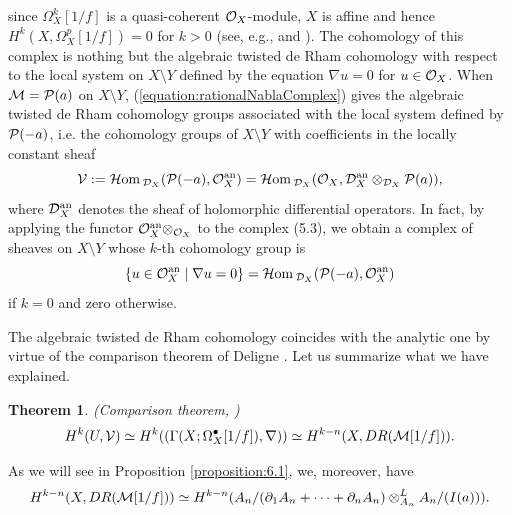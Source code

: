 \documentclass[12pt]{article}
\def\pd#1{ \partial_{#1} }
\def\Hom{ {\cal H}{\rm om}\, }
\def\Dsc{ {\cal D} }
\def\Msc{ {\cal M} }
\def\Osc{ {\cal O} }
\def\Psc{ {\cal P} }
\def\Vsc{ {\cal V} }
\newtheorem{theorem}{Theorem}[section]
\begin{document}
since $\Omega_X^{k}[1/f]$ is a quasi-coherent $\Osc_X$-module,
$X$ is affine and hence
$ H^k(X,\Omega_X^p[1/f]) = 0$ for $k > 0$
(see, e.g., \cite[p. 205, Proposition 1.2A, p.215, Theorem 3.7]{HartshornBook}
and \cite{Serre}).
The cohomology of this complex is nothing but the algebraic 
twisted de Rham cohomology with respect to the local system on 
$X\setminus Y$ defined by
the equation $\nabla u = 0$ for $u \in \Osc_X$.
When $\Msc = \Psc(a)$ on $X \setminus Y$, 
(\ref{equation:rationalNablaComplex}) 
gives the algebraic twisted de Rham 
cohomology groups associated with the local system defined by $\Psc(-a)$, 
i.e. the cohomology groups of $X\setminus Y$ 
with coefficients in the locally constant sheaf 
$$
{\cal V} := \Hom_{\Dsc_X}(\Psc(-a),\Osc_X^{\rm an})
= \Hom_{\Dsc_X}(\Osc_X, \Dsc_X^{\rm an}\otimes_{\Dsc_X}\Psc(a)),
$$
where $\Dsc^{\rm an}_X$ denotes the sheaf of holomorphic differential 
operators.  
In fact, by applying the functor $\Osc^{\rm an}_X\otimes_{\Osc_X}$ to
the complex (5.3), we obtain a complex of sheaves on $X\setminus Y$ 
whose $k$-th cohomology group is
$$
\{ u \in \Osc^{\rm an}_X \mid \nabla u = 0\} 
= \Hom_{\Dsc_X}(\Psc(-a),\Osc_X^{\rm an})
$$
if $k=0$ and zero otherwise.

The algebraic twisted de Rham cohomology coincides with the analytic
one by virtue of the comparison theorem of Deligne 
\cite[p.98 Theorem 6.2, p.99 Corollary 6.3]{D}.
Let us summarize what we have explained.

\begin{theorem} {\rm (Comparison theorem, \cite{D})}
\label{theorem:comparison}
$$H^k(U,\Vsc) 
\simeq H^{k}((\Gamma(X;\Omega_X^{\bullet}[1/f]),\nabla))
\simeq  H^{k-n}(X, DR(\Msc[1/f])).
$$
\end{theorem}


As we will see in Proposition \ref{proposition:6.1},
we, moreover, have
$$
H^{k-n}(X, DR(\Msc[1/f])) 
\simeq 
 H^{k-n}(A_n/(\pd{1} A_n + \cdots + \pd{n} A_n) \otimes_{A_n}^{ L}
 A_n/(I(a))).
$$
\end{document}
